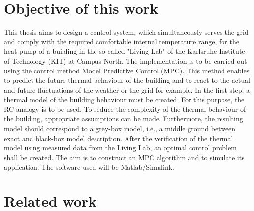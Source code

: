 \section{Objective of this work}
\label{section:obejective}
    This thesis aims to design a control system, which simultaneously serves the grid and comply with the required comfortable internal temperature range, for the heat pump of a building in the so-called "Living Lab" of the Karlsruhe Institute of Technology (KIT) at Campus North. The implementation is to be carried out using the control method Model Predictive Control (MPC). This method enables to predict the future thermal behaviour of the building and to react to the actual and future fluctuations of the weather or the grid for example. 
    In the first step, a thermal model of the building behaviour must be created. For this purpose, the RC analogy is to be used. To reduce the complexity of the thermal behaviour of the building, appropriate assumptions can be made. Furthermore, the resulting model should correspond to a grey-box model, i.e., a middle ground between exact and black-box model description. After the verification of the thermal model using measured data from the Living Lab, an optimal control problem shall be created. The aim is to construct an MPC algorithm and to simulate its application. The software used will be Matlab/Simulink.

\section{Related work}
\label{section:relatedwork}

